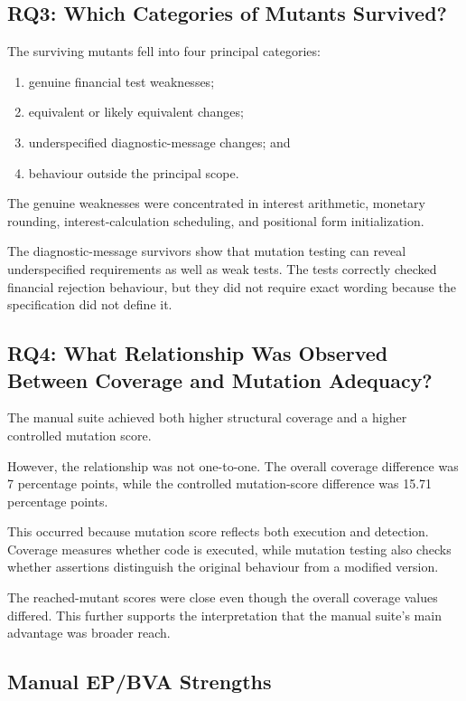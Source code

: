 \documentclass[12pt]{article}
\begin{document}
\subsection{RQ3: Which Categories of Mutants Survived?}

The surviving mutants fell into four principal categories:

\begin{enumerate}
    \item genuine financial test weaknesses;
    \item equivalent or likely equivalent changes;
    \item underspecified diagnostic-message changes; and
    \item behaviour outside the principal scope.
\end{enumerate}

The genuine weaknesses were concentrated in interest arithmetic, monetary
rounding, interest-calculation scheduling, and positional form initialization.

The diagnostic-message survivors show that mutation testing can reveal
underspecified requirements as well as weak tests. The tests correctly checked
financial rejection behaviour, but they did not require exact wording because
the specification did not define it.

\subsection{RQ4: What Relationship Was Observed Between Coverage and Mutation
Adequacy?}

The manual suite achieved both higher structural coverage and a higher
controlled mutation score.

However, the relationship was not one-to-one. The overall coverage difference
was 7 percentage points, while the controlled mutation-score difference was
15.71 percentage points.

This occurred because mutation score reflects both execution and detection.
Coverage measures whether code is executed, while mutation testing also checks
whether assertions distinguish the original behaviour from a modified version.

The reached-mutant scores were close even though the overall coverage values
differed. This further supports the interpretation that the manual suite's
main advantage was broader reach.

\subsection{Manual EP/BVA Strengths}
\end{document}
